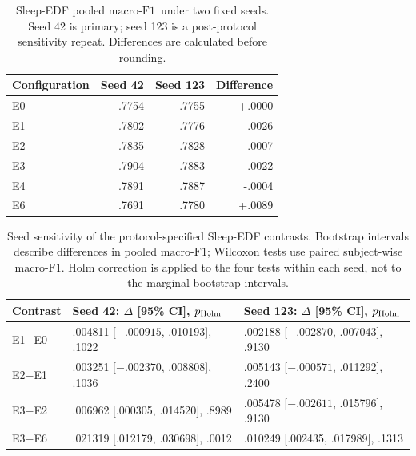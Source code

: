 \documentclass[10pt,a4paper]{article}
\newcommand{\mf}{\ensuremath{\mathrm{macro\text{-}F1}}}
\newcommand{\ci}{95\% CI}
\begin{document}
\begin{table}[H]
\centering\small
\caption{Sleep-EDF pooled \mf\ under two fixed seeds. Seed 42 is primary; seed 123 is a
post-protocol sensitivity repeat. Differences are calculated before rounding.}
\label{tab:sup_edf_seeds}
\begin{tabular}{lrrr}
\toprule
Configuration & Seed 42 & Seed 123 & Difference \\
\midrule
E0 & .7754 & .7755 & +.0000 \\
E1 & .7802 & .7776 & -.0026 \\
E2 & .7835 & .7828 & -.0007 \\
E3 & .7904 & .7883 & -.0022 \\
E4 & .7891 & .7887 & -.0004 \\
E6 & .7691 & .7780 & +.0089 \\
\bottomrule
\end{tabular}
\end{table}

\begin{table}[H]
\centering\small
\caption{Seed sensitivity of the protocol-specified Sleep-EDF contrasts. Bootstrap intervals
describe differences in pooled \mf; Wilcoxon tests use paired subject-wise \mf. Holm correction
is applied to the four tests within each seed, not to the marginal bootstrap intervals.}
\label{tab:sup_edf_seed_contrasts}
\begin{tabular}{lll}
\toprule
Contrast & Seed 42: $\Delta$ [\ci], $p_{\rm Holm}$ & Seed 123: $\Delta$ [\ci], $p_{\rm Holm}$ \\
\midrule
E1$-$E0 & .004811 [$-.000915$, .010193], .1022 & .002188 [$-.002870$, .007043], .9130 \\
E2$-$E1 & .003251 [$-.002370$, .008808], .1036 & .005143 [$-.000571$, .011292], .2400 \\
E3$-$E2 & .006962 [.000305, .014520], .8989 & .005478 [$-.002611$, .015796], .9130 \\
E3$-$E6 & .021319 [.012179, .030698], .0012 & .010249 [.002435, .017989], .1313 \\
\bottomrule
\end{tabular}
\end{table}
\end{document}
